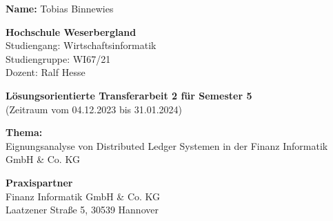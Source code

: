 \documentclass[12pt, a4paper]{article}
\begin{document}



    {\pagestyle{empty}


\noindent
\textbf{Name:} Tobias Binnewies

\bigbreak
\bigbreak
\bigbreak
\bigbreak
\bigbreak
\bigbreak
\bigbreak
\bigbreak


\noindent
\textbf{Hochschule Weserbergland} \\
Studiengang: Wirtschaftsinformatik \\
Studiengruppe: WI67/21 \\
Dozent: Ralf Hesse

\bigbreak
\bigbreak
\bigbreak
\bigbreak
\bigbreak
\bigbreak
\bigbreak
\bigbreak

\noindent
\textbf{Lösungsorientierte Transferarbeit 2 für Semester 5} \\
(Zeitraum vom 04.12.2023 bis 31.01.2024)

\bigbreak
\bigbreak
\bigbreak
\bigbreak

\noindent
\textbf{Thema:} \\
Eignungsanalyse von Distributed Ledger Systemen in der Finanz Informatik GmbH \& Co. KG

\bigbreak
\bigbreak
\bigbreak
\bigbreak

\noindent
\textbf{Praxispartner} \\
Finanz Informatik GmbH \& Co. KG \\
Laatzener Straße 5, 30539 Hannover

\bigbreak

\newpage

    }
    \newpage





    
\end{document}
